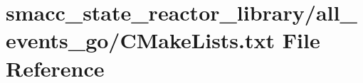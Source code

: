 \hypertarget{state__reactor__library_2all__events__go_2CMakeLists_8txt}{}\section{smacc\+\_\+state\+\_\+reactor\+\_\+library/all\+\_\+events\+\_\+go/\+C\+Make\+Lists.txt File Reference}
\label{state__reactor__library_2all__events__go_2CMakeLists_8txt}
